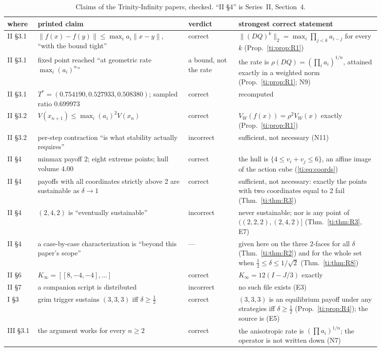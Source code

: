 \documentclass[11pt]{amsart}
\theoremstyle{remark}
\begin{document}
\begin{table}[ht]\centering\small
\begin{tabular}{@{}p{0.07\linewidth}p{0.36\linewidth}p{0.12\linewidth}p{0.34\linewidth}@{}}
\toprule
where & printed claim & verdict & strongest correct statement \\
\midrule
II \S3.1 & $\|f(x)-f(y)\|\le\max_i a_i\|x-y\|$, ``with the bound tight'' & correct &
  $\|(DQ)^k\|_2=\max_i\prod_{j<k}a_{i-j}$ for every $k$ (Prop.~\ref{ti:prop:R1}) \\
II \S3.1 & fixed point reached ``at geometric rate $\max_i(a_i)^n$'' & a bound, not the rate &
  the rate is $\rho(DQ)=(\prod_i a_i)^{1/n}$, attained exactly in a weighted norm (Prop.~\ref{ti:prop:R1}; N9) \\
II \S3.1 & $T^*=(0.754190,0.527933,0.508380)$; sampled ratio $0.699973$ & correct & recomputed \\
II \S3.2 & $V(x_{n+1})\le\max_i(a_i)^2V(x_n)$ & correct & $V_W(f(x))=\rho^2V_W(x)$ exactly (Prop.~\ref{ti:prop:R1}) \\
II \S3.2 & per-step contraction ``is what stability actually requires'' & incorrect & sufficient, not necessary (N11) \\
II \S4 & minmax payoff 2; eight extreme points; hull volume $4.00$ & correct &
  the hull is $\{4\le v_i+v_j\le 6\}$, an affine image of the action cube (\eqref{ti:eq:coords}) \\
II \S4 & payoffs with all coordinates strictly above 2 are sustainable as $\delta\to1$ & correct &
  sufficient, not necessary: exactly the points with two coordinates equal to 2 fail (Thm.~\ref{ti:thm:R3}) \\
II \S4 & $(2,4,2)$ is ``eventually sustainable'' & incorrect &
  never sustainable; nor is any point of $((2,2,2),(2,4,2)]$ (Thm.~\ref{ti:thm:R3}, E7) \\
II \S4 & a case-by-case characterization is ``beyond this paper's scope'' & --- &
  given here on the three 2-faces for all $\delta$ (Thm.~\ref{ti:thm:R2}) and for the whole set when $\tfrac12\le\delta\le1/\sqrt2$ (Thm.~\ref{ti:thm:R8}) \\
II \S6 & $K_\infty=[[8,-4,-4],\dots]$ & correct & $K_\infty=12(I-J/3)$ exactly \\
II \S7 & a companion script is distributed & incorrect & no such file exists (E3) \\
I \S3 & grim trigger sustains $(3,3,3)$ iff $\delta\ge\frac12$ & correct &
  $(3,3,3)$ is an equilibrium payoff under any strategies iff $\delta\ge\frac12$ (Prop.~\ref{ti:prop:R4}); the source is \cite{Friedman71} (E5) \\
III \S3.1 & the argument works for every $n\ge2$ & correct & the anisotropic rate is $(\prod a_i)^{1/n}$; the operator is not written down (N7) \\
\bottomrule
\end{tabular}
\caption{Claims of the Trinity-Infinity papers, checked. ``II \S4'' is Series~II, Section~4.}
\label{ti:tab:inventory}
\end{table}
\end{document}
